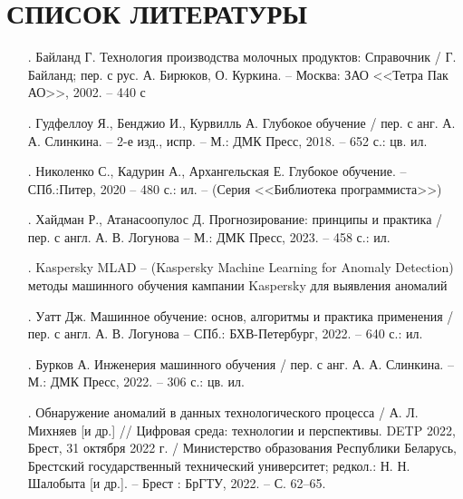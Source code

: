 \sectionbreak \section*{ 
    \gostTitleFont
    \redline
    СПИСОК ЛИТЕРАТУРЫ
}
\titlespace

{\gostFont

\begin{itemize}[leftmargin=2.15cm, labelwidth=0.65cm, labelsep=0.0cm] 

    \item[\theimagecntr.] Байланд Г. Технология производства молочных продуктов: Справочник / Г. Байланд; пер. с рус. А. Бирюков, О. Куркина. {--} Москва: ЗАО <<Тетра Пак АО>>, 2002. {--} 440 с
    \addtocounter{imagecntr}{1}

    \item[\theimagecntr.] Гудфеллоу Я., Бенджио И., Курвилль А. Глубокое обучение / пер. с анг. А. А. Слинкина. {--} 2-е изд., испр. {--} М.: ДМК Пресс, 2018. {--} 652 с.: цв. ил. 
    \addtocounter{imagecntr}{1}

    \item[\theimagecntr.] Николенко С., Кадурин А., Архангельская Е. Глубокое обучение. {--} СПб.:Питер, 2020 {--} 480 с.: ил. {--} (Серия <<Библиотека программиста>>)
    \addtocounter{imagecntr}{1}

    \item[\theimagecntr.] Хайдман Р., Атанасоопулос Д. Прогнозирование: принципы и практика / пер. с англ. А. В. Логунова {--} М.: ДМК Пресс, 2023. {--} 458 с.: ил. 
    \addtocounter{imagecntr}{1}

    \item[\theimagecntr.] Kaspersky MLAD {--} (Kaspersky Machine Learning for Anomaly Detection) методы машинного обучения кампании Kaspersky для выявления аномалий
    \addtocounter{imagecntr}{1}

    \item[\theimagecntr.] Уатт Дж. Машинное обучение: основ, алгоритмы и практика применения / пер. с англ. А. В. Логунова {--} СПб.: БХВ-Петербург, 2022. {--} 640 с.: ил. 
    \addtocounter{imagecntr}{1}

    \item[\theimagecntr.] Бурков А. Инженерия машинного обучения / пер. с анг. А. А. Слинкина. {--} М.: ДМК Пресс, 2022. {--} 306 с.: цв. ил.
    \addtocounter{imagecntr}{1}

    \item[\theimagecntr.] Обнаружение аномалий в данных технологического процесса / А. Л. Михняев [и др.] // Цифровая среда: технологии и перспективы. DETP 2022, Брест, 31 октября 2022 г. / Министерство образования Республики Беларусь, Брестский государственный технический университет; редкол.: Н. Н. Шалобыта [и др.]. {--} Брест : БрГТУ, 2022. {--} С. 62–65.
    \addtocounter{imagecntr}{1}


\end{itemize}}
